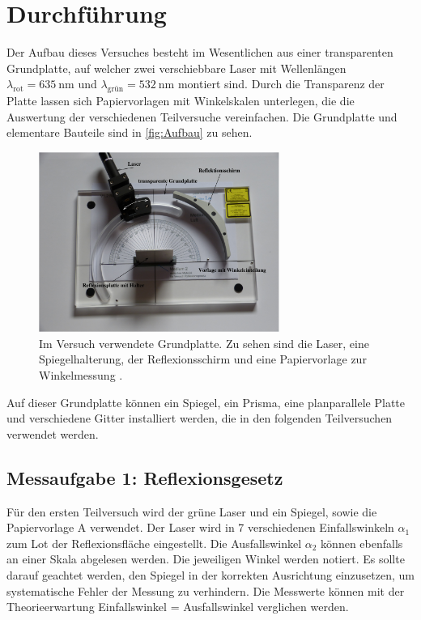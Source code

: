 \section{Durchführung}
\label{sec:Durchführung}
Der Aufbau dieses Versuches besteht im Wesentlichen aus einer transparenten Grundplatte, auf welcher zwei verschiebbare Laser mit Wellenlängen $\lambda_\text{rot} =
\qty{635}{\nano\metre}$ und $\lambda_\text{grün} = \qty{532}{\nano\metre}$ montiert sind.
Durch die Transparenz der Platte lassen sich Papiervorlagen mit Winkelskalen unterlegen, die die Auswertung der verschiedenen Teilversuche vereinfachen.
Die Grundplatte und elementare Bauteile sind in \autoref{fig:Aufbau} zu sehen.

\begin{figure}
  \centering
  \includegraphics[width=0.7\textwidth]{content/Platte.png}
  \caption{Im Versuch verwendete Grundplatte. Zu sehen sind die Laser, eine Spiegelhalterung, der Reflexionsschirm und eine Papiervorlage zur Winkelmessung \cite{v400}.}
  \label{fig:Aufbau}
\end{figure}
  
Auf dieser Grundplatte können ein Spiegel, ein Prisma, eine planparallele Platte und verschiedene Gitter installiert werden, die in den folgenden Teilversuchen verwendet werden.

\subsection{Messaufgabe 1: Reflexionsgesetz}
\label{subsec:D_Reflexion}
Für den ersten Teilversuch wird der grüne Laser und ein Spiegel, sowie die Papiervorlage A verwendet. Der Laser wird in 7 verschiedenen Einfallswinkeln $\alpha_1$ 
zum Lot der Reflexionsfläche eingestellt. Die Ausfallswinkel $\alpha_2$ können ebenfalls an einer Skala abgelesen werden. Die jeweiligen Winkel werden notiert. 
Es sollte darauf geachtet werden, den Spiegel in der korrekten Ausrichtung
einzusetzen, um systematische Fehler der Messung zu verhindern. Die Messwerte können mit der Theorieerwartung \dq Einfallswinkel = Ausfallswinkel\dq \; verglichen werden.

